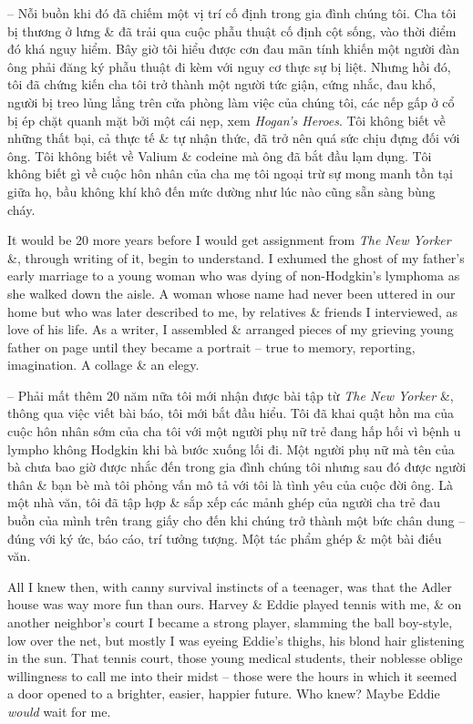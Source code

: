 \documentclass{article}
\begin{document}
\begin{itemize}
	-- Nỗi buồn khi đó đã chiếm một vị trí cố định trong gia đình chúng tôi. Cha tôi bị thương ở lưng \& đã trải qua cuộc phẫu thuật cố định cột sống, vào thời điểm đó khá nguy hiểm. Bây giờ tôi hiểu được cơn đau mãn tính khiến một người đàn ông phải đăng ký phẫu thuật đi kèm với nguy cơ thực sự bị liệt. Nhưng hồi đó, tôi đã chứng kiến cha tôi trở thành một người tức giận, cứng nhắc, đau khổ, người bị treo lủng lẳng trên cửa phòng làm việc của chúng tôi, các nếp gấp ở cổ bị ép chặt quanh mặt bởi một cái nẹp, xem {\it Hogan's Heroes}. Tôi không biết về những thất bại, cả thực tế \& tự nhận thức, đã trở nên quá sức chịu đựng đối với ông. Tôi không biết về Valium \& codeine mà ông đã bắt đầu lạm dụng. Tôi không biết gì về cuộc hôn nhân của cha mẹ tôi ngoại trừ sự mong manh tồn tại giữa họ, bầu không khí khô đến mức dường như lúc nào cũng sẵn sàng bùng cháy.
	
	It would be 20 more years before I would get assignment from {\it The New Yorker} \&, through writing of it, begin to understand. I exhumed the ghost of my father's early marriage to a young woman who was dying of non-Hodgkin's lymphoma as she walked down the aisle. A woman whose name had never been uttered in our home but who was later described to me, by relatives \& friends I interviewed, as love of his life. As a writer, I assembled \& arranged pieces of my grieving young father on page until they became a portrait -- true to memory, reporting, imagination. A collage \& an elegy.
	
	-- Phải mất thêm 20 năm nữa tôi mới nhận được bài tập từ {\it The New Yorker} \&, thông qua việc viết bài báo, tôi mới bắt đầu hiểu. Tôi đã khai quật hồn ma của cuộc hôn nhân sớm của cha tôi với một người phụ nữ trẻ đang hấp hối vì bệnh u lympho không Hodgkin khi bà bước xuống lối đi. Một người phụ nữ mà tên của bà chưa bao giờ được nhắc đến trong gia đình chúng tôi nhưng sau đó được người thân \& bạn bè mà tôi phỏng vấn mô tả với tôi là tình yêu của cuộc đời ông. Là một nhà văn, tôi đã tập hợp \& sắp xếp các mảnh ghép của người cha trẻ đau buồn của mình trên trang giấy cho đến khi chúng trở thành một bức chân dung -- đúng với ký ức, báo cáo, trí tưởng tượng. Một tác phẩm ghép \& một bài điếu văn.
	
	All I knew then, with canny survival instincts of a teenager, was that the Adler house was way more fun than ours. {\sc Harvey \& Eddie} played tennis with me, \& on another neighbor's court I became a strong player, slamming the ball boy-style, low over the net, but mostly I was eyeing {\sc Eddie}'s thighs, his blond hair glistening in the sun. That tennis court, those young medical students, their noblesse oblige willingness to call me into their midst -- those were the hours in which it seemed a door opened to a brighter, easier, happier future. Who knew? Maybe {\sc Eddie} {\it would} wait for me.
	

\end{itemize}
\end{document}
